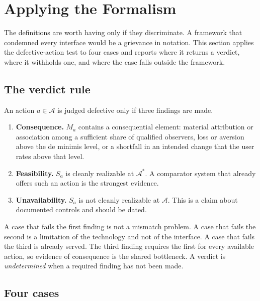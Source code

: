 
\section{Applying the Formalism}\label{sec:apps}

The definitions are worth having only if they discriminate. A framework that condemned every interface would be a grievance in notation. This section applies the defective-action test to four cases and reports where it returns a verdict, where it withholds one, and where the case falls outside the framework.

\subsection{The verdict rule}

An action $a\in\mathcal{A}$ is judged defective only if three findings are made.
\begin{enumerate}
  \item \textbf{Consequence.} $M_a$ contains a consequential element: material attribution or association among a sufficient share of qualified observers, loss or aversion above the de minimis level, or a shortfall in an intended change that the user rates above that level.
  \item \textbf{Feasibility.} $S_a$ is cleanly realizable at $\mathcal{A}^{*}$. A comparator system that already offers such an action is the strongest evidence.
  \item \textbf{Unavailability.} $S_a$ is not cleanly realizable at $\mathcal{A}$. This is a claim about documented controls and should be dated.
\end{enumerate}
A case that fails the first finding is not a mismatch problem. A case that fails the second is a limitation of the technology and not of the interface. A case that fails the third is already served. The third finding requires the first for every available action, so evidence of consequence is the shared bottleneck. A verdict is \emph{undetermined} when a required finding has not been made.

\subsection{Four cases}

